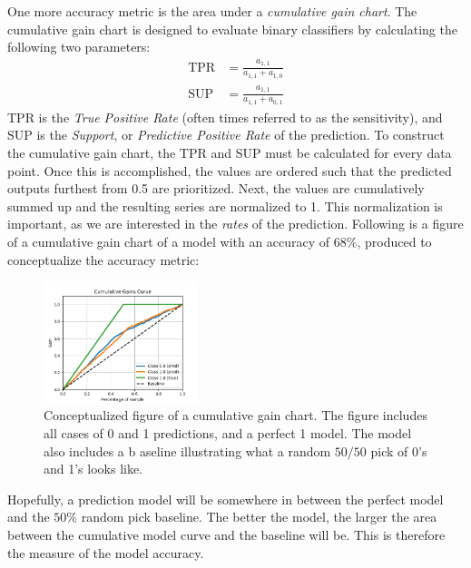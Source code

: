             One more accuracy metric is the area under a \textit{cumulative gain chart}. The cumulative gain chart is designed to evaluate binary classifiers by calculating the following two parameters:
            \begin{align}
                \text{TPR} &= \frac{a_{1,1}}{a_{1,1}+a_{1,0}}\\
                \text{SUP} &= \frac{a_{1,1}}{a_{1,1}+a_{0,1}}
            \end{align}
            TPR is the \textit{True Positive Rate} (often times referred to as the sensitivity), and SUP is the \textit{Support}, or \textit{Predictive Positive Rate} of the prediction. To construct the cumulative gain chart, the TPR and SUP must be calculated for every data point. Once this is accomplished, the values are ordered such that the predicted outputs furthest from 0.5 are prioritized. Next, the values are cumulatively summed up and the resulting series are normalized to 1. This normalization is important, as we are interested in the \textit{rates} of the prediction. Following is a figure of a cumulative gain chart of a model with an accuracy of $68\%$, produced to conceptualize the accuracy metric:
            \begin{figure}[H]
                \centering
                \includegraphics[width=0.4\textwidth]{figures/cumulative-gain_curve-concept.png}
                \caption{Conceptualized figure of a cumulative gain chart. The figure includes all cases of 0 and 1 predictions, and a perfect 1 model. The model also includes a b                                                                                 aseline illustrating what a random $50/50$ pick of 0's and 1's looks like.}
                \label{fig:conceptual_cumulative_gains}
            \end{figure}
            Hopefully, a prediction model will be somewhere in between the perfect model and the $50\%$ random pick baseline. The better the model, the larger the area between the cumulative model curve and the baseline will be. This is therefore the measure of the model accuracy.\\\\
